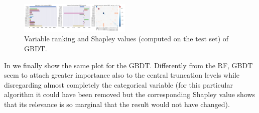 \begin{figure}[htbp]
  \centering
  \includegraphics[width=0.475\textwidth]{img/grd_bst_shapley}
  \caption{Variable ranking and Shapley values (computed on the test set) of GBDT.}
  \label{fig:ml:grd_bst_shap}
\end{figure}

In  we finally show the same plot for the GBDT.
Differently from the RF, GBDT seem to attach greater importance also to the
central truncation levels while disregarding almost completely the categorical
variable (for this particular algorithm it could have been removed but the
corresponding Shapley value shows that its relevance is so marginal that the
result would not have changed).
